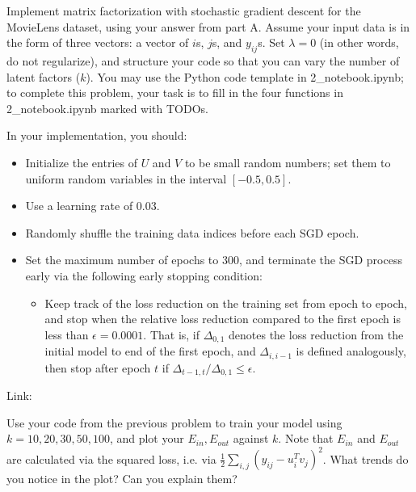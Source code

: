 Implement matrix factorization with stochastic gradient descent for the MovieLens dataset, using your answer from part A. Assume your input data is in the form of three vectors: a vector of $i$s, $j$s, and $y_{ij}$s. Set $\lambda = 0$ (in other words, do not regularize), and structure your code so that you can vary the number of latent factors ($k$). You may use the Python code template in 2_notebook.ipynb; to complete this problem, your task is to fill in the four functions in 2_notebook.ipynb marked with TODOs.

In your implementation, you should:

\begin{itemize}
\item Initialize the entries of $U$ and $V$ to be small random numbers; set them to uniform random variables in the interval $[-0.5, 0.5]$.
\item Use a learning rate of 0.03.
\item Randomly shuffle the training data indices before each SGD epoch.
\item Set the maximum number of epochs to 300, and terminate the SGD process early via the following early stopping condition:
\begin{itemize}
\item Keep track of the loss reduction on the training set from epoch to epoch, and stop when the relative loss reduction compared to the first epoch is less than $\epsilon = 0.0001$.  That is, if $\Delta_{0,1}$ denotes the loss reduction from the initial model to end of the first epoch, and $\Delta_{i, i-1}$ is defined analogously, then stop after epoch $t$ if $\Delta_{t-1,t} / \Delta_{0,1} \leq \epsilon$.
\end{itemize}
\end{itemize}

\begin{solution}
 Link:

\end{solution}

\problem[5]
Use your code from the previous problem to train your model using $k=10, 20, 30, 50, 100$, and plot your $E_{in}, E_{out}$ against $k$. Note that $E_{in}$ and $E_{out}$ are calculated via the squared loss, i.e. via $\frac{1}{2}\sum_{i,j} \left( y_{ij} - u_i^Tv_j\right)^2$. What trends do you notice in the plot? Can you explain them?

